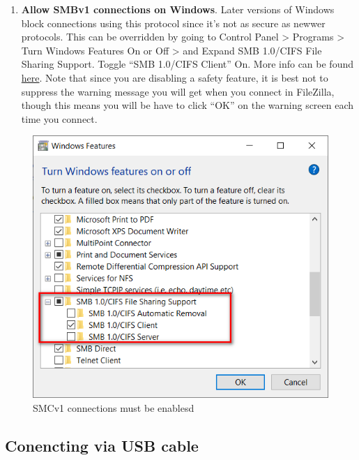 \documentclass[
]{book}
\providecommand{\tightlist}{%
  \setlength{\itemsep}{0pt}\setlength{\parskip}{0pt}}
\begin{document}
\begin{enumerate}
\def\labelenumi{\arabic{enumi}.}
\setcounter{enumi}{1}
\tightlist
\item
  \textbf{Allow SMBv1 connections on Windows}.
  Later versions of Windows block connections using this protocol since it's not as secure as newwer protocols. This can be overridden by going to Control Panel \textgreater{} Programs \textgreater{} Turn Windows Features On or Off \textgreater{} and Expand SMB 1.0/CIFS File Sharing Support. Toggle ``SMB 1.0/CIFS Client'' On. More info can be found \href{https://www.windowscentral.com/how-access-files-network-devices-using-smbv1-windows-10}{here}. Note that since you are disabling a safety feature, it is best not to suppress the warning message you will get when you connect in FileZilla, though this means you will be have to click ``OK'' on the warning screen each time you connect.
\end{enumerate}

\begin{figure}

{\centering \includegraphics[width=7.71in]{images/smb} 

}

\caption{SMCv1 connections must be enablesd}\label{fig:unnamed-chunk-3}
\end{figure}

\hypertarget{conencting-via-usb-cable}{%
\subsection{Conencting via USB cable}\label{conencting-via-usb-cable}}
\end{document}
